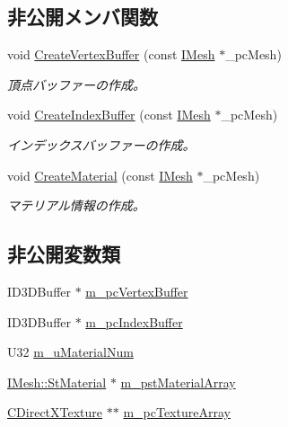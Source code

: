 \subsection*{非公開メンバ関数}
\begin{DoxyCompactItemize}
\item 
void \hyperlink{class_c_mesh_drawer_aae1ac0846695db38abfc282b9f3bd829}{Create\+Vertex\+Buffer} (const \hyperlink{class_i_mesh}{I\+Mesh} $\ast$\+\_\+pc\+Mesh)
\begin{DoxyCompactList}\small\item\em 頂点バッファーの作成。 \end{DoxyCompactList}\item 
void \hyperlink{class_c_mesh_drawer_af01061282afe0e1c73be2b8faeb144b0}{Create\+Index\+Buffer} (const \hyperlink{class_i_mesh}{I\+Mesh} $\ast$\+\_\+pc\+Mesh)
\begin{DoxyCompactList}\small\item\em インデックスバッファーの作成。 \end{DoxyCompactList}\item 
void \hyperlink{class_c_mesh_drawer_a20a0681c8e2835a8e16988011e1b20e1}{Create\+Material} (const \hyperlink{class_i_mesh}{I\+Mesh} $\ast$\+\_\+pc\+Mesh)
\begin{DoxyCompactList}\small\item\em マテリアル情報の作成。 \end{DoxyCompactList}\end{DoxyCompactItemize}
\subsection*{非公開変数類}
\begin{DoxyCompactItemize}
\item 
I\+D3\+D\+Buffer $\ast$ \hyperlink{class_c_mesh_drawer_afd868ffa4352ee572c96ce27503ffbef}{m\+\_\+pc\+Vertex\+Buffer}
\item 
I\+D3\+D\+Buffer $\ast$ \hyperlink{class_c_mesh_drawer_ac0ff368c1f0142014951771916e81859}{m\+\_\+pc\+Index\+Buffer}
\item 
U32 \hyperlink{class_c_mesh_drawer_a1f43f0a290e81f825c5b504df8d73f04}{m\+\_\+u\+Material\+Num}
\item 
\hyperlink{struct_i_mesh_1_1_st_material}{I\+Mesh\+::\+St\+Material} $\ast$ \hyperlink{class_c_mesh_drawer_a8dfc3abb01754af03e7df870da7a872d}{m\+\_\+pst\+Material\+Array}
\item 
\hyperlink{class_c_direct_x_texture}{C\+Direct\+X\+Texture} $\ast$$\ast$ \hyperlink{class_c_mesh_drawer_a1e05fd8e03370903b786ad8ef4921cfa}{m\+\_\+pc\+Texture\+Array}
\end{DoxyCompactItemize}


